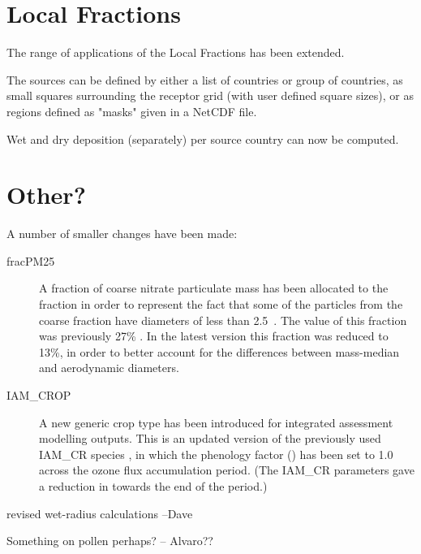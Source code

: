 
\section{Local Fractions}
\label{sec:updateLF}


The range of applications of the Local Fractions has been extended. 

The sources can be defined by either a list of countries or group of countries, as small squares surrounding the receptor grid (with user defined square sizes), or as regions defined as "masks" given in a NetCDF file.

Wet and dry deposition (separately) per source country can now be computed.



\section{Other?}
\label{sec:updateOther}

A number of smaller changes have been made:

\begin{description}
  \item[fracPM25] A fraction of coarse nitrate particulate mass has been allocated to the \PM[2.5] fraction in order to represent the fact that some of the particles from the coarse fraction have diameters of less than 2.5~\um. The value of this fraction was previously 27\% \citep{Simpson:EMEP2012}. In the latest version this fraction was reduced to 13\%, in order to better account for the differences between mass-median and aerodynamic diameters.
  \item[IAM\_CROP] A new generic crop type has been introduced for integrated assessment modelling outputs. This is an updated version of the previously used IAM\_CR species \citep{Simpson:EMEP2012}, in which the phenology factor (\fphen) has been set to 1.0 across the ozone flux accumulation period. (The IAM\_CR parameters gave a reduction in \fphen towards the end of the period.)
\end{description}


revised wet-radius calculations --Dave

Something on pollen perhaps? -- Alvaro??



\clearpage
\renewcommand\bibname{References}      %

